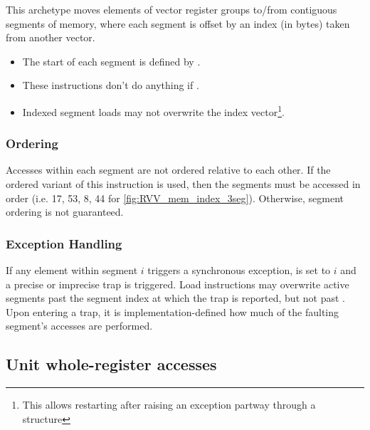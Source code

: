 This archetype moves elements of  vector register groups to/from contiguous segments of memory,
where each segment is offset by an index (in bytes) taken from another vector.

\begin{itemize}
\item The start of each segment is defined by .
\item These instructions don't do anything if .
\item Indexed segment loads may not overwrite the index vector\footnote{This allows restarting after raising an exception partway through a structure}.
\end{itemize}

\subsubsection*{Ordering}
Accesses within each segment are not ordered relative to each other.
If the ordered variant of this instruction is used, then the segments must be accessed in order (i.e. 17, 53, 8, 44 for \cref{fig:RVV_mem_index_3seg}).
Otherwise, segment ordering is not guaranteed.


\subsubsection*{Exception Handling}
If any element within segment $i$ triggers a synchronous exception,  is set to $i$ and a precise or imprecise trap is triggered.
Load instructions may overwrite active segments past the segment index at which the trap is reported, but not past \cite[Section~7.7]{specification-RVV-v1.0}.
Upon entering a trap, it is implementation-defined how much of the faulting segment's accesses are performed.

\pagebreak
\subsection{Unit whole-register accesses}

